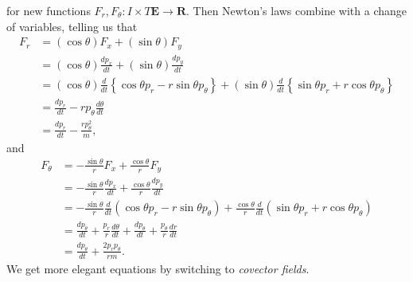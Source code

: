 %
for new functions $F_r,F_\theta: I \times T \mathbf{E} \to \mathbf{R}$. Then Newton's laws combine with a change of variables, telling us that
%
\begin{align*}
    F_r &= (\cos \theta) F_x + (\sin \theta) F_y\\
        &= (\cos \theta) \frac{d p_x}{dt} + (\sin \theta) \frac{d p_y}{dt}\\
        &= (\cos \theta) \frac{d}{dt} \left\{ \cos \theta p_r - r \sin \theta p_\theta \right\} + (\sin \theta) \frac{d}{dt} \left\{ \sin \theta p_r + r \cos \theta p_\theta \right\}\\
        &= \frac{dp_r}{dt} - r p_\theta \frac{d\theta}{dt}\\
        &= \frac{dp_r}{dt} - \frac{r p_\theta^2}{m},
\end{align*}
%
and
%
\begin{align*}
    F_\theta &= - \frac{\sin \theta}{r} F_x + \frac{\cos \theta}{r} F_y\\
    &= - \frac{\sin \theta}{r} \frac{dp_x}{dt} + \frac{\cos \theta}{r} \frac{dp_y}{dt}\\
    &= - \frac{\sin \theta}{r} \frac{d}{dt} \left( \cos \theta p_r - r \sin \theta p_\theta \right) + \frac{\cos \theta}{r} \frac{d}{dt} \left( \sin \theta p_r + r \cos \theta p_\theta \right)\\
    &= \frac{dp_\theta}{dt} + \frac{p_r}{r} \frac{d\theta}{dt} + \frac{dp_\theta}{dt} + \frac{p_\theta}{r} \frac{dr}{dt}\\
    &= \frac{dp_\theta}{dt} + \frac{2p_rp_\theta}{rm}.
\end{align*}
%
We get more elegant equations by switching to \emph{covector fields}.

